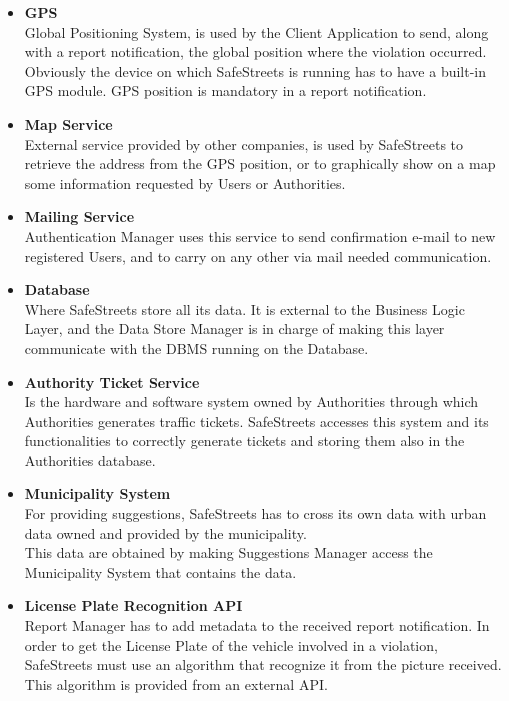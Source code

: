 \begin{itemize}
    \item \textbf{GPS}\\
    Global Positioning System, is used by the Client Application to send, along with a report notification, the global position where the violation occurred.\\
    Obviously the device on which SafeStreets is running has to have a built-in GPS module. GPS position is mandatory in a report notification.
    
    \item\textbf{Map Service}\\
    External service provided by other companies, is used by SafeStreets to retrieve the address from the GPS position, or to graphically show on a map some information requested by Users or Authorities.
    
    \item\textbf{Mailing Service}\\
    Authentication Manager uses this service to send confirmation e-mail to new registered Users, and to carry on any other via mail needed communication.
    
    \item\textbf{Database}\\
    Where SafeStreets store all its data. It is external to the Business Logic Layer, and the Data Store Manager is in charge of making this layer communicate with the DBMS running on the Database. 
    
    \item\textbf{Authority Ticket Service}\\
    Is the hardware and software system owned by Authorities through which Authorities generates traffic tickets. SafeStreets accesses this system and its functionalities to correctly generate tickets and storing them also in the Authorities database.
    
    \item\textbf{Municipality System}\\
    For providing suggestions, SafeStreets has to cross its own data with urban data owned and provided by the municipality. \\
    This data are obtained by  making Suggestions Manager access the Municipality System that contains the data.
    
    \item\textbf{License Plate Recognition API}\\
    Report Manager has to add metadata to the received report notification.
    In order to get the License Plate of the vehicle involved  in a violation, SafeStreets must use an algorithm that recognize it from the picture received.\\
    This algorithm is provided from an external API.
    

\end{itemize}
